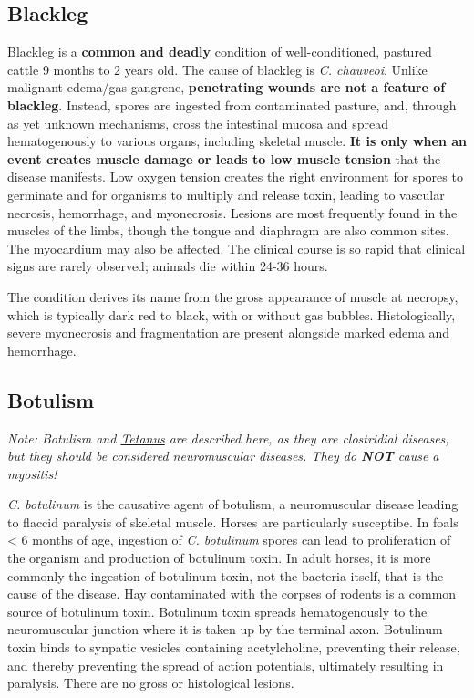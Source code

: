 \documentclass[openany]{report}
\begin{document}
\subsection{Blackleg}\label{blackleg}

Blackleg is a \textbf{common and deadly} condition of well-conditioned,
pastured cattle 9 months to 2 years old. The cause of blackleg is
\emph{C. chauveoi}. Unlike malignant edema/gas gangrene,
\textbf{penetrating wounds are not a feature of blackleg}. Instead,
spores are ingested from contaminated pasture, and, through as yet
unknown mechanisms, cross the intestinal mucosa and spread
hematogenously to various organs, including skeletal muscle. \textbf{It
is only when an event creates muscle damage or leads to low muscle
tension} that the disease manifests. Low oxygen tension creates the
right environment for spores to germinate and for organisms to multiply
and release toxin, leading to vascular necrosis, hemorrhage, and
myonecrosis. Lesions are most frequently found in the muscles of the
limbs, though the tongue and diaphragm are also common sites. The
myocardium may also be affected. The clinical course is so rapid that
clinical signs are rarely observed; animals die within 24-36 hours.

The condition derives its name from the gross appearance of muscle at
necropsy, which is typically dark red to black, with or without gas
bubbles. Histologically, severe myonecrosis and fragmentation are
present alongside marked edema and hemorrhage.

\hypertarget{botulism}{\subsection{Botulism}\label{botulism}}

\emph{Note: Botulism and \protect\hyperlink{tetanus}{Tetanus} are
described here, as they are clostridial diseases, but they should be
considered neuromuscular diseases. They do \textbf{NOT} cause a
myositis!}

\emph{C. botulinum} is the causative agent of botulism, a neuromuscular
disease leading to flaccid paralysis of skeletal muscle. Horses are
particularly susceptibe. In foals \textless{} 6 months of age, ingestion
of \emph{C. botulinum} spores can lead to proliferation of the organism
and production of botulinum toxin. In adult horses, it is more commonly
the ingestion of botulinum toxin, not the bacteria itself, that is the
cause of the disease. Hay contaminated with the corpses of rodents is a
common source of botulinum toxin. Botulinum toxin spreads hematogenously
to the neuromuscular junction where it is taken up by the terminal axon.
Botulinum toxin binds to synpatic vesicles containing acetylcholine,
preventing their release, and thereby preventing the spread of action
potentials, ultimately resulting in paralysis. There are no gross or
histological lesions.
\end{document}
